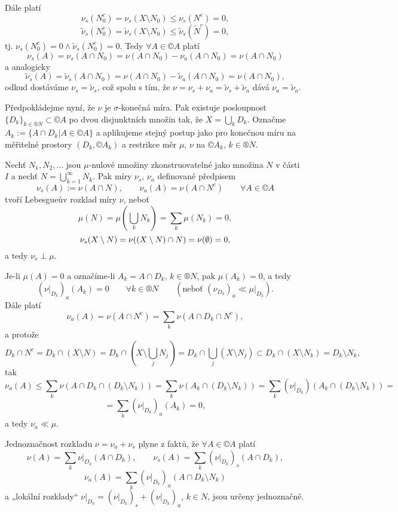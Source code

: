 \documentclass[12pt]{article}					%
\begin{document}
\begin{veta}
\begin{dukazin}
		Dále platí
		$$ \nu_s(N_0^c) = \nu_s (X \setminus N_0) ≤ \nu_s(N^c) = 0, $$
		$$ \tilde \nu_s(N_0^c) = \tilde \nu_s (X \setminus N_0) ≤ \tilde \nu_s(\tilde N^c) = 0, $$
		tj. $\nu_s(N_0^c) = 0 \land \tilde \nu_s(N_0^c) = 0$. Tedy $\forall A \in ©A$ platí
		$$ \nu_s(A) = \nu_s(A \cap N_0) = \nu(A \cap N_0) - \nu_a(A \cap N_0) = \nu(A \cap N_0) $$
		a analogicky
		$$ \tilde \nu_s(A) = \tilde \nu_s(A \cap N_0) = \nu(A \cap N_0) - \tilde \nu_a(A \cap N_0) = \nu(A \cap N_0), $$
		odkud dostáváme $\nu_s = \tilde \nu_s$, což spolu s tím, že $\nu = \nu_s + \nu_a = \tilde \nu_s + \tilde \nu_a$ dává $\nu_a = \tilde \nu_a$.
	\end{dukazin}

	\begin{dukazin}
		Předpokládejme nyní, že $\nu$ je $\sigma$-konečná míra. Pak existuje posloupnost $\{D_k\}_{k \in ®N} \subset ©A$ po dvou disjunktních množin tak, že $X = \bigcup_k D_k$. Označme $A_k := \{A \cap D_k | A \in ©A\}$ a aplikujeme stejný postup jako pro konečnou míru na měřitelné prostory $(D_k, ©A_k)$ a restrikce měr $\mu$, $\nu$ na $©A_k$, $k \in ®N$.

		Nechť $N_1, N_2, …$ jsou $\mu$-nulové množiny zkonstruovatelné jako množina $N$ v části $I$ a nechť $N = \bigcup_{k=1}^∞ N_k$. Pak míry $\nu_s$, $\nu_a$ definované předpisem
		$$ \nu_s(A) := \nu(A \cap N), \qquad \nu_a(A) = \nu(A \cap N^c) \qquad \forall A \in ©A $$
		tvoří Lebesgueův rozklad míry $\nu$, neboť
		$$ \mu(N) = \mu(\bigcup_k N_k) = \sum_k \mu(N_k) = 0, $$
		$$ \nu_s(X \setminus N) = \nu((X \setminus N) \cap N) = \nu(\emptyset) = 0, $$
		a tedy $\nu_s \perp \mu$.

		Je-li $\mu(A) = 0$ a označíme-li $A_k = A \cap D_k$, $k \in ®N$, pak $\mu(A_k) = 0$, a tedy
		$$ (\nu|_{D_k})_a(A_k) = 0 \qquad \forall k \in ®N \qquad (\text{neboť } (\nu_{D_k})_a \ll \mu|_{D_k}). $$
		Dále platí
		$$ \nu_a(A) = \nu(A \cap N^c) = \sum_k \nu(A \cap D_k \cap N^c), $$
		a protože
		$$ D_k \cap N^c = D_k \cap (X \setminus N) = D_k \cap (X \setminus \bigcup_j N_j) = D_k \cap \bigcup_j (X \setminus N_j) \subset D_k \cap (X \setminus N_k) = D_k \setminus N_k, $$
		tak
		$$ \nu_a(A) ≤ \sum_k \nu(A \cap D_k \cap (D_k \setminus N_k)) = \sum_k \nu(A_k \cap (D_k \setminus N_k)) = \sum_k (\nu|_{D_k})(A_k \cap (D_k \setminus N_k)) = $$
		$$ = \sum_k(\nu|_{D_k})_a(A_k) = 0, $$
		a tedy $\nu_a \ll \mu$.

		Jednoznačnost rozkladu $\nu = \nu_a + \nu_s$ plyne z faktů, že $\forall A \in ©A$ platí
		$$ \nu(A) = \sum_k \nu|_{D_k} (A \cap D_k), \qquad \nu_s(A) = \sum_k(\nu|_{D_k})_s (A \cap D_k), $$
		$$ \nu_a(A) = \sum_k (\nu|_{D_k})_a (A \cap D_k \setminus N_k) $$
		a „lokální rozklady“ $\nu|_{D_k} = (\nu|_{D_k})_s + (\nu|_{D_k})_a$, $k \in N$, jsou určeny jednoznačně.
	\end{dukazin}
\end{veta}
\end{document}
